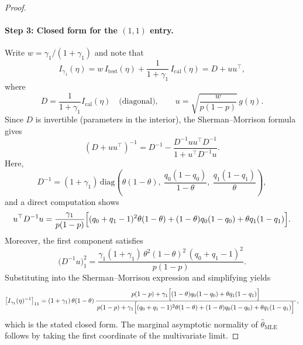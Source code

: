 \begin{proof}
\paragraph{Step 3: Closed form for the $(1,1)$ entry.}
Write $w=\gamma_1/(1+\gamma_1)$ and note that
\[
I_{\gamma_1}(\eta)=w\,I_{\mathrm{test}}(\eta)+\frac{1}{1+\gamma_1}\,I_{\mathrm{cal}}(\eta)
=
D + uu^\top,
\]
where
\[
D=\frac{1}{1+\gamma_1}I_{\mathrm{cal}}(\eta)
\quad\text{(diagonal)},\qquad
u=\sqrt{\frac{w}{p(1-p)}}\,g(\eta).
\]
Since $D$ is invertible (parameters in the interior), the Sherman--Morrison formula gives
\[
(D+uu^\top)^{-1}
=
D^{-1}-\frac{D^{-1}uu^\top D^{-1}}{1+u^\top D^{-1}u}.
\]
Here,
\[
D^{-1}
=(1+\gamma_1)\,
\mathrm{diag}\!\left(
\theta(1-\theta),\ \frac{q_0(1-q_0)}{1-\theta},\ \frac{q_1(1-q_1)}{\theta}
\right),
\]
and a direct computation shows
\[
u^\top D^{-1}u
=
\frac{\gamma_1}{p(1-p)}
\Bigl[(q_0+q_1-1)^2\theta(1-\theta)+(1-\theta)q_0(1-q_0)+\theta q_1(1-q_1)\Bigr].
\]
Moreover, the first component satisfies
\[
\bigl(D^{-1}u\bigr)_1^2
=
\frac{\gamma_1(1+\gamma_1)\,\theta^2(1-\theta)^2\,(q_0+q_1-1)^2}{p(1-p)}.
\]
Substituting into the Sherman--Morrison expression and simplifying yields
\[
\bigl[I_{\gamma_1}(\eta)^{-1}\bigr]_{11}
=
(1+\gamma_1)\,\theta(1-\theta)\,
\frac{\,p(1-p)+\gamma_1\Bigl[(1-\theta)q_0(1-q_0)+\theta q_1(1-q_1)\Bigr]\;}
{\,p(1-p)+\gamma_1\Bigl[(q_0+q_1-1)^2\theta(1-\theta)+(1-\theta)q_0(1-q_0)+\theta q_1(1-q_1)\Bigr]\;},
\]
which is the stated closed form. The marginal asymptotic normality of $\hat\theta_{\mathrm{MLE}}$ follows by taking the
first coordinate of the multivariate limit.
\end{proof}

